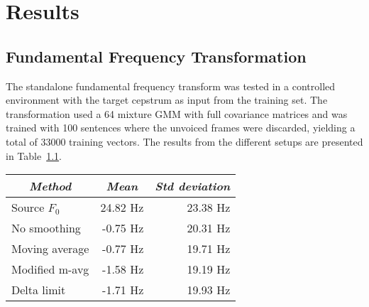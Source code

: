 \chapter{Results} %
\label{cha:results}

% 
% 
% 
% 
% 


\section{Fundamental Frequency Transformation} %
\label{sec:fundamental_frequency_ransformation}
The standalone fundamental frequency transform was tested in a controlled environment with the target cepstrum as input from the training set. The transformation used a 64 mixture GMM with full covariance matrices and was trained with 100 sentences where the unvoiced frames were discarded, yielding a total of 33000 training vectors. The results from the different setups are presented in Table~\ref{tab:pitch_pred_target_input}.
\begin{table}[htbp]
	\begin{center}
		\label{tab:pitch_pred_target_input}	
		\begin{tabular}{lrr}
			\toprule
			\multicolumn{1}{c}{\emph{Method}} & \multicolumn{1}{c}{\emph{Mean}} & \multicolumn{1}{c}{\emph{Std deviation}} \\
			\midrule
			Source $F_0$ & 24.82 Hz & 23.38 Hz \\
			No smoothing & -0.75 Hz & 20.31 Hz\\
			Moving average & -0.77 Hz & 19.71 Hz\\
			Modified m-avg & -1.58 Hz & 19.19 Hz \\
			Delta limit & -1.71 Hz & 19.93 Hz \\
			\bottomrule			
		\end{tabular}		
	\end{center}
\end{table}


